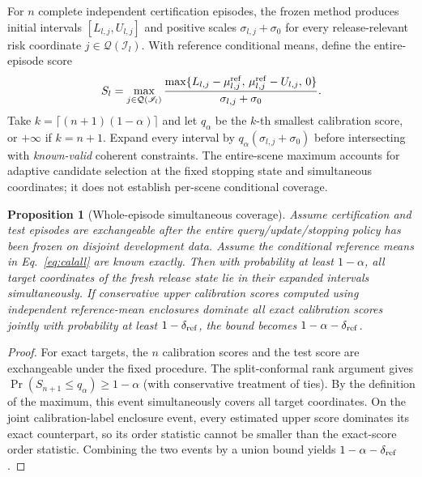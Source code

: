 \documentclass[10pt]{article}
\newtheorem{proposition}{Proposition}\newtheorem{assumption}{Assumption}\newtheorem{remark}{Remark}
\begin{document}
For $n$ complete independent certification episodes, the frozen method produces initial intervals $[L_{l,j},U_{l,j}]$ and positive scales $\sigma_{l,j}+\sigma_0$ for every release-relevant risk coordinate $j\in\mathcal Q(\mathscr I_l)$. With reference conditional means, define the entire-episode score
\begin{equation}
 S_l=\max_{j\in\mathcal Q(\mathscr I_l)}
 \frac{\max\{L_{l,j}-\mu_{l,j}^{\rm ref},\,\mu_{l,j}^{\rm ref}-U_{l,j},\,0\}}
 {\sigma_{l,j}+\sigma_0}.
 \label{eq:calall}
\end{equation}
Take $k=\lceil(n+1)(1-\alpha)\rceil$ and let $q_\alpha$ be the $k$-th smallest calibration score, or $+\infty$ if $k=n+1$. Expand every interval by $q_\alpha(\sigma_{l,j}+\sigma_0)$ before intersecting with \emph{known-valid} coherent constraints. The entire-scene maximum accounts for adaptive candidate selection at the fixed stopping state and simultaneous coordinates; it does not establish per-scene conditional coverage.

\begin{proposition}[Whole-episode simultaneous coverage]\label{prop:coverage}
Assume certification and test episodes are exchangeable after the entire query/update/stopping policy has been frozen on disjoint development data. Assume the conditional reference means in Eq.~\eqref{eq:calall} are known exactly. Then with probability at least $1-\alpha$, all target coordinates of the fresh release state lie in their expanded intervals simultaneously. If conservative upper calibration scores computed using independent reference-mean enclosures dominate all exact calibration scores jointly with probability at least $1-\delta_{\rm ref}$, the bound becomes $1-\alpha-\delta_{\rm ref}$.
\end{proposition}
\begin{proof}
For exact targets, the $n$ calibration scores and the test score are exchangeable under the fixed procedure. The split-conformal rank argument gives $\Pr(S_{n+1}\le q_\alpha)\ge1-\alpha$ (with conservative treatment of ties). By the definition of the maximum, this event simultaneously covers all target coordinates. On the joint calibration-label enclosure event, every estimated upper score dominates its exact counterpart, so its order statistic cannot be smaller than the exact-score order statistic. Combining the two events by a union bound yields $1-\alpha-\delta_{\rm ref}$.
\end{proof}
\end{document}
